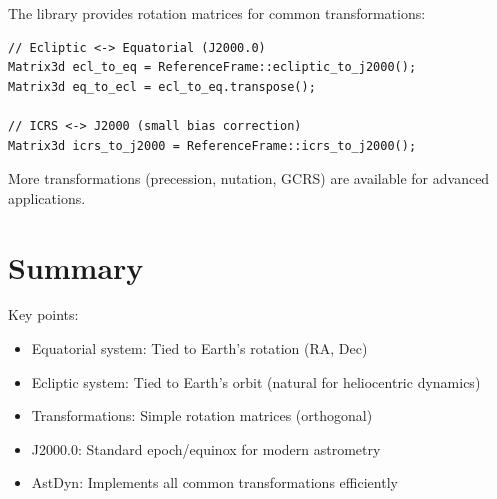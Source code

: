 The library provides rotation matrices for common transformations:

\begin{lstlisting}[style=cpp,caption={Available transformations}]
// Ecliptic <-> Equatorial (J2000.0)
Matrix3d ecl_to_eq = ReferenceFrame::ecliptic_to_j2000();
Matrix3d eq_to_ecl = ecl_to_eq.transpose();

// ICRS <-> J2000 (small bias correction)
Matrix3d icrs_to_j2000 = ReferenceFrame::icrs_to_j2000();
\end{lstlisting}

More transformations (precession, nutation, GCRS) are available for advanced applications.

\section{Summary}

Key points:
\begin{itemize}
    \item Equatorial system: Tied to Earth's rotation (RA, Dec)
    \item Ecliptic system: Tied to Earth's orbit (natural for heliocentric dynamics)
    \item Transformations: Simple rotation matrices (orthogonal)
    \item J2000.0: Standard epoch/equinox for modern astrometry
    \item AstDyn: Implements all common transformations efficiently
\end{itemize}
